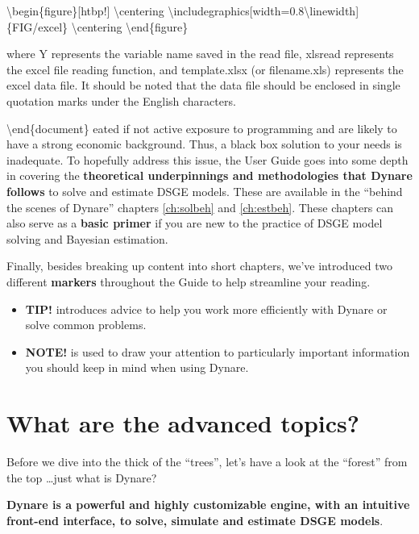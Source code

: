 \documentclass[10pt,math=newtx,citestyle=gb7714-2015,bibstyle=gb7714-2015]{elegantbook}
\begin{document}
	\textbackslash{}begin\{figure\}[htbp!]
	\textbackslash{}centering
	\textbackslash{}includegraphics[width=0.8\textbackslash{}linewidth]\{FIG/excel\}
	\textbackslash{}centering
	\textbackslash{}end\{figure\}
	
	where Y represents the variable name saved in the read file, xlsread represents the excel file reading function, and template.xlsx (or filename.xls) represents the excel data file. It should be noted that the data file should be enclosed in single quotation marks under the English characters.
	
	
	
	
	\textbackslash{}end\{document\}
	eated if not active exposure to programming and are likely to have a strong economic background. Thus, a black box solution to your needs is inadequate. To hopefully address this issue, the User Guide goes into some depth in covering the \textbf{theoretical underpinnings and methodologies that Dynare follows} to solve and estimate DSGE models. These are available in the ``behind the scenes of Dynare'' chapters \ref{ch:solbeh} and \ref{ch:estbeh}. These chapters can also serve as a \textbf{basic primer} if you are new to the practice of DSGE model solving and Bayesian estimation. 
	
	Finally, besides breaking up content into short chapters, we've introduced two different \textbf{markers} throughout the Guide to help streamline your reading.
	\begin{itemize}
		\item \textbf{\textsf{TIP!}} introduces advice to help you work more efficiently with Dynare or solve common problems.
		\item \textbf{\textsf{NOTE!}} is used to draw your attention to particularly important information you should keep in mind when using Dynare.
	\end{itemize}
	
	
	\section{What are the advanced topics?}
	Before we dive into the thick of the ``trees'', let's have a look at the ``forest'' from the top \ldots just what is Dynare? 
	
	\textbf{Dynare is a powerful and highly customizable engine, with an intuitive front-end interface, to solve, simulate and estimate DSGE models}. 
	
\end{document}
